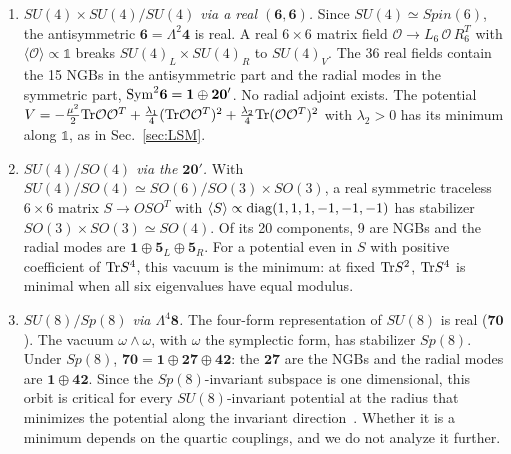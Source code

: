 \begin{enumerate}
\item \emph{$SU(4)\times SU(4)/SU(4)$ via a real $(\mathbf6,\mathbf6)$.} Since $SU(4)\simeq Spin(6)$, the antisymmetric $\mathbf6=\Lambda^2\mathbf4$ is real. A real $6\times6$ matrix field $\mathcal O\to L_6\,\mathcal O\,R_6^T$ with $\langle\mathcal O\rangle\propto\mathbb{1}$ breaks $SU(4)_L\times SU(4)_R$ to $SU(4)_V$. The 36 real fields contain the 15 NGBs in the antisymmetric part and the radial modes in the symmetric part, ${\rm Sym}^2\mathbf6=\mathbf1\oplus\mathbf{20}'$. No radial adjoint exists. The potential $V=-\frac{\mu^2}{2}\mathrm{Tr}\mathcal O\mathcal O^T+\frac{\lambda_1}{4}(\mathrm{Tr}\mathcal O\mathcal O^T)^2+\frac{\lambda_2}{4}\mathrm{Tr}(\mathcal O\mathcal O^T)^2$ with $\lambda_2>0$ has its minimum along $\mathbb{1}$, as in Sec.~\ref{sec:LSM}.
\item \emph{$SU(4)/SO(4)$ via the $\mathbf{20}'$.} With $SU(4)/SO(4)\simeq SO(6)/SO(3)\times SO(3)$, a real symmetric traceless $6\times6$ matrix $S\to OSO^T$ with $\langle S\rangle\propto{\rm diag}(1,1,1,-1,-1,-1)$ has stabilizer $SO(3)\times SO(3)\simeq SO(4)$. Of its 20 components, 9 are NGBs and the radial modes are $\mathbf1\oplus\mathbf5_L\oplus\mathbf5_R$. For a potential even in $S$ with positive coefficient of $\mathrm{Tr} S^4$, this vacuum is the minimum: at fixed $\mathrm{Tr} S^2$, $\mathrm{Tr} S^4$ is minimal when all six eigenvalues have equal modulus.
\item \emph{$SU(8)/Sp(8)$ via $\Lambda^4\mathbf8$.} The four-form representation of $SU(8)$ is real ($\mathbf{70}$). The vacuum $\omega\wedge\omega$, with $\omega$ the symplectic form, has stabilizer $Sp(8)$. Under $Sp(8)$, $\mathbf{70}=\mathbf1\oplus\mathbf{27}\oplus\mathbf{42}$: the $\mathbf{27}$ are the NGBs and the radial modes are $\mathbf1\oplus\mathbf{42}$. Since the $Sp(8)$-invariant subspace is one dimensional, this orbit is critical for every $SU(8)$-invariant potential at the radius that minimizes the potential along the invariant direction~\cite{Michel:1971}. Whether it is a minimum depends on the quartic couplings, and we do not analyze it further.
\end{enumerate}

